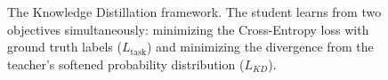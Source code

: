 \begin{figure}[h!]
\begin{tikzpicture}[scale=0.85, every node/.style={transform shape}]

    \end{tikzpicture}
    \caption{The Knowledge Distillation framework. The student learns from two objectives simultaneously: minimizing the Cross-Entropy loss with ground truth labels ($L_{\text{task}}$) and minimizing the divergence from the teacher's softened probability distribution ($L_{KD}$).}
    \label{fig:knowledge_distillation}
\end{figure}